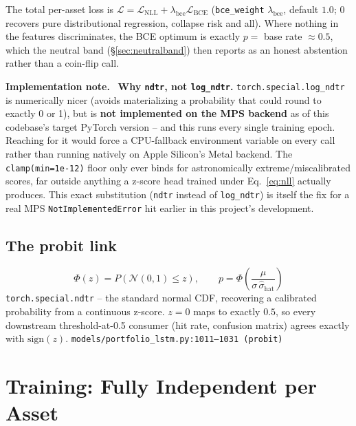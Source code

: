 \documentclass[11pt]{article}
\newcommand{\srcref}[1]{\hfill\textcolor{cmtcolor}{\footnotesize\texttt{#1}}}
\newcommand{\code}[1]{\texttt{\small #1}}
\newcommand{\fixnotelabel}{\small\textbf{Implementation note.}~}
\begin{document}
The total per-asset loss is $\mathcal{L} = \mathcal{L}_{\text{NLL}} + \lambda_{\text{bce}}
\mathcal{L}_{\text{BCE}}$ (\code{bce\_weight} $\lambda_{\text{bce}}$, default $1.0$; $0$
recovers pure distributional regression, collapse risk and all). Where nothing in the
features discriminates, the BCE optimum is exactly $p = $ base rate $\approx 0.5$, which the
neutral band (\S\ref{sec:neutralband}) then reports as an honest abstention rather than a
coin-flip call.

\begin{fixnote}\fixnotelabel
\textbf{Why \texttt{ndtr}, not \texttt{log\_ndtr}.} \code{torch.special.log\_ndtr} is
numerically nicer (avoids materializing a probability that could round to exactly 0 or 1),
but is \textbf{not implemented on the MPS backend} as of this codebase's target PyTorch
version -- and this runs every single training epoch. Reaching for it would force a
CPU-fallback environment variable on every call rather than running natively on Apple
Silicon's Metal backend. The \code{clamp(min=1e-12)} floor only ever binds for
astronomically extreme/miscalibrated scores, far outside anything a z-score head trained
under Eq.~\ref{eq:nll} actually produces. This exact substitution (\code{ndtr} instead of
\code{log\_ndtr}) is itself the fix for a real MPS \code{NotImplementedError} hit earlier in
this project's development.
\end{fixnote}

\subsection{The probit link}

\begin{equation}
  \Phi(z) = P(\mathcal{N}(0,1) \le z), \qquad p = \Phi\!\left(\frac{\mu}{\sigma\,\hat\sigma_{\text{hat}}}\right)
  \label{eq:probit}
\end{equation}
\code{torch.special.ndtr} -- the standard normal CDF, recovering a calibrated probability
from a continuous z-score. $z=0$ maps to exactly $0.5$, so every downstream threshold-at-0.5
consumer (hit rate, confusion matrix) agrees exactly with $\mathrm{sign}(z)$.
\srcref{models/portfolio\_lstm.py:1011--1031 (\texttt{probit})}

\section{Training: Fully Independent per Asset}
\label{sec:training}
\end{document}
